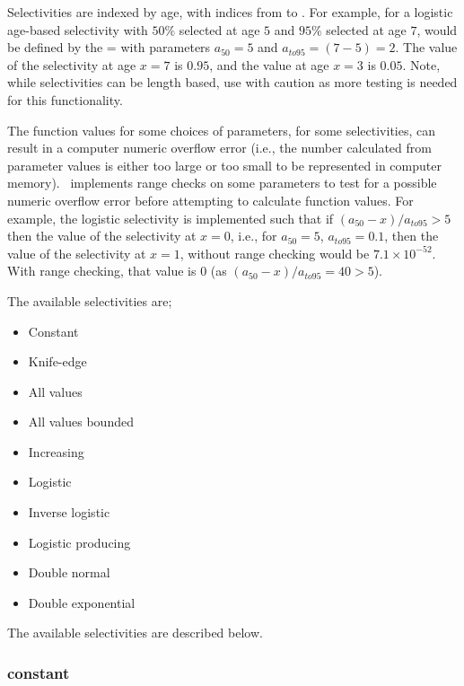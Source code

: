 Selectivities are indexed by age, with indices from  to . For example, for a logistic age-based selectivity with $50\%$ selected at age $5$ and $95\%$ selected at age $7$, would be defined by the = with parameters $a_{50}=5$ and $a_{to95}=(7-5)=2$. The value of the selectivity at age $x=7$ is $0.95$, and the value at age $x=3$ is $0.05$. Note, while selectivities can be length based, use with caution as more testing is needed for this functionality.

The function values for some choices of parameters, for some selectivities, can result in a computer numeric overflow error (i.e., the number calculated from parameter values is either too large or too small to be represented in computer memory). \IBM\ implements range checks on some parameters to test for a possible numeric overflow error before attempting to calculate function values. For example, the logistic selectivity is implemented such that if $(a_{50}-x)/a_{to95} > 5$ then the value of the selectivity at $x=0$, i.e., for $a_{50}=5$, $a_{to95}=0.1$, then the value of the selectivity at $x=1$, without range checking would be $7.1 \times 10^{-52}$. With range checking, that value is $0$ (as $(a_{50}-x)/a_{to95}=40 > 5$).

The available selectivities are;

\begin{itemize}
  \item Constant
  \item Knife-edge
  \item All values
  \item All values bounded
  \item Increasing
  \item Logistic
  \item Inverse logistic
  \item Logistic producing
  \item Double normal
  \item Double exponential
\end{itemize}

The available selectivities are described below.

\subsubsection[Constant]{{constant}}

